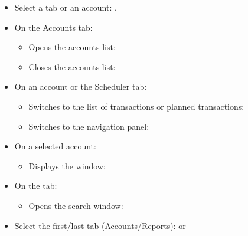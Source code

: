 \begin{itemize}
	\item Select a tab or an account: \keys{\arrowkeyup}, \keys{\arrowkeydown}
	\item On the Accounts tab:%
	\begin{itemize}
		\item Opens the accounts list: \keys{\arrowkeyright}%
		\item Closes the accounts list: \keys{\arrowkeyleft}%
	\end{itemize}
	\item On an account or the Scheduler tab:%
	\begin{itemize}
		\item Switches to the list of transactions or planned transactions: \keys{\arrowkeyright}%
		\item Switches to the navigation panel: \keys{\arrowkeyleft}%
	\end{itemize}
	\item On a selected account:
	\begin{itemize}
		\item Displays the  window: 
	\end{itemize}
	\item On the  tab:
	\begin{itemize}
		\item Opens the  search window: 
	\end{itemize}	
	\item Select the first/last tab (Accounts/Reports):  or %
\end{itemize}


